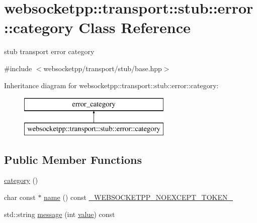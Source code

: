 \hypertarget{classwebsocketpp_1_1transport_1_1stub_1_1error_1_1category}{}\section{websocketpp\+:\+:transport\+:\+:stub\+:\+:error\+:\+:category Class Reference}
\label{classwebsocketpp_1_1transport_1_1stub_1_1error_1_1category}


stub transport error category  




{\ttfamily \#include $<$websocketpp/transport/stub/base.\+hpp$>$}

Inheritance diagram for websocketpp\+:\+:transport\+:\+:stub\+:\+:error\+:\+:category\+:\begin{figure}[H]
\begin{center}
\leavevmode
\includegraphics[height=2.000000cm]{classwebsocketpp_1_1transport_1_1stub_1_1error_1_1category}
\end{center}
\end{figure}
\subsection*{Public Member Functions}
\begin{DoxyCompactItemize}
\item 
\hyperlink{classwebsocketpp_1_1transport_1_1stub_1_1error_1_1category_a85ac03c6cef394a6e160723751fde4bf}{category} ()
\item 
char const $\ast$ \hyperlink{classwebsocketpp_1_1transport_1_1stub_1_1error_1_1category_a9ba015d3bbd5b18d1cf8d64cd0a60e31}{name} () const \hyperlink{boost__config_8hpp_aa19747404a5f2fe9c9eb9e9d2e48f26c}{\+\_\+\+W\+E\+B\+S\+O\+C\+K\+E\+T\+P\+P\+\_\+\+N\+O\+E\+X\+C\+E\+P\+T\+\_\+\+T\+O\+K\+E\+N\+\_\+}
\item 
std\+::string \hyperlink{classwebsocketpp_1_1transport_1_1stub_1_1error_1_1category_a695b81d53a7dec467c74c2e9ebf993cd}{message} (int \hyperlink{namespacewebsocketpp_1_1transport_1_1stub_1_1error_abff42d9e608f90864af8d628f6932022}{value}) const 
\end{DoxyCompactItemize}


